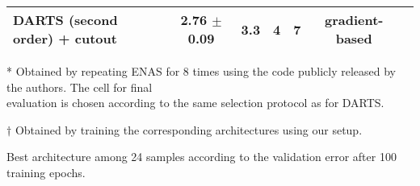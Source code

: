 \documentclass{article}
\begin{document}
\begin{table}[ht]
\begin{threeparttable}[b]
{\begin{tabular}{@{}lcccccc@{}}
DARTS (second order) + cutout                             & 2.76 $\pm$ 0.09 &  3.3  & 4 & 7 & gradient-based \\ \bottomrule
\end{tabular}
}
\begin{tablenotes}
\item[*] {\footnotesize Obtained by repeating ENAS for 8 times using the code publicly released by the authors. The cell for final \\ evaluation is chosen according to the same selection protocol as for DARTS.
}
\item[$\dagger$] {\footnotesize Obtained by training the corresponding architectures using our setup.}
\item[\ddag] {\footnotesize Best architecture among 24 samples according to the validation error after 100 training epochs.
}
\end{tablenotes}
\end{threeparttable}
\end{table}
\end{document}
